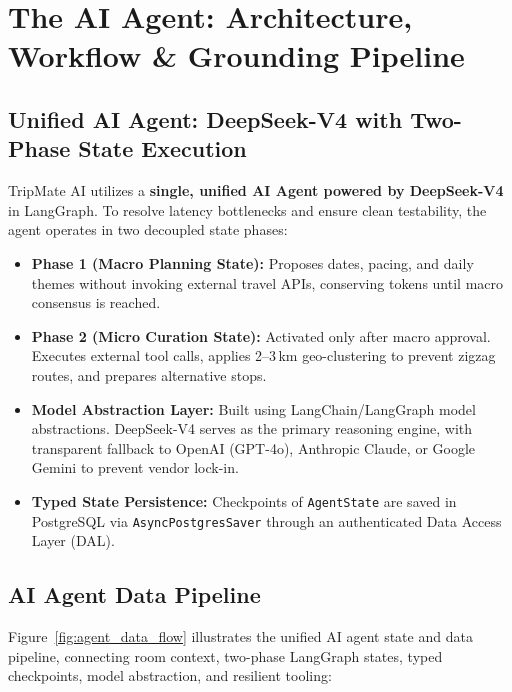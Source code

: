 \documentclass[11pt,a4paper]{article}
\begin{document}
\clearpage
\section{The AI Agent: Architecture, Workflow \& Grounding Pipeline}

\subsection{Unified AI Agent: DeepSeek-V4 with Two-Phase State Execution}
TripMate AI utilizes a \textbf{single, unified AI Agent powered by DeepSeek-V4} in LangGraph. To resolve latency bottlenecks and ensure clean testability, the agent operates in two decoupled state phases:
\begin{itemize}
\item \textbf{Phase 1 (Macro Planning State):} Proposes dates, pacing, and daily themes without invoking external travel APIs, conserving tokens until macro consensus is reached.
\item \textbf{Phase 2 (Micro Curation State):} Activated only after macro approval. Executes external tool calls, applies 2--3\,km geo-clustering to prevent zigzag routes, and prepares alternative stops.
\item \textbf{Model Abstraction Layer:} Built using LangChain/LangGraph model abstractions. DeepSeek-V4 serves as the primary reasoning engine, with transparent fallback to OpenAI (GPT-4o), Anthropic Claude, or Google Gemini to prevent vendor lock-in.
\item \textbf{Typed State Persistence:} Checkpoints of \texttt{AgentState} are saved in PostgreSQL via \texttt{AsyncPostgresSaver} through an authenticated Data Access Layer (DAL).
\end{itemize}

\subsection{AI Agent Data Pipeline}
\label{sec:agent_integration}
Figure~\ref{fig:agent_data_flow} illustrates the unified AI agent state and data pipeline, connecting room context, two-phase LangGraph states, typed checkpoints, model abstraction, and resilient tooling:
\end{document}
